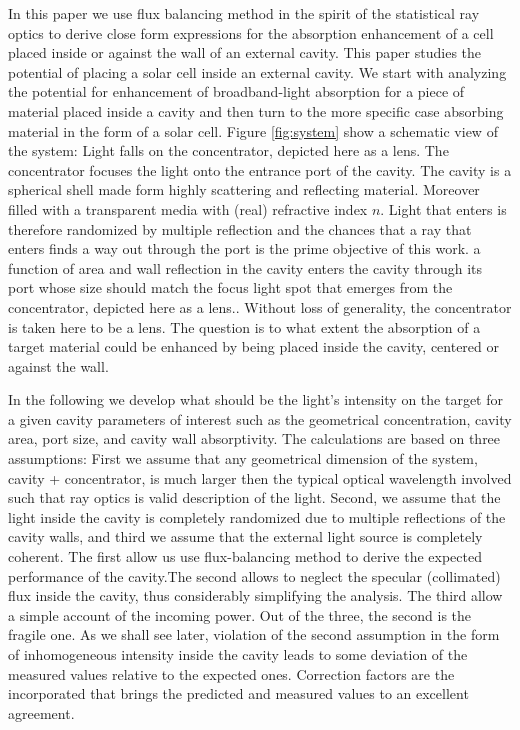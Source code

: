 \documentclass[a4paper]{article}
\begin{document}
In this paper we use flux balancing method in the spirit of the statistical ray optics to derive close form expressions for the absorption enhancement of a cell placed inside or against the wall of an external cavity.
\listoftodos
This paper studies the potential of placing a solar cell inside an external cavity. We start with analyzing the potential for enhancement of broadband-light absorption for a piece of material placed inside a cavity and then turn to the  more specific case absorbing material in the form of a solar cell. Figure \ref{fig:system} show a schematic view of the system: Light falls on the concentrator, depicted here as a lens. The concentrator focuses the light onto the entrance port of the cavity. The cavity is a spherical shell made form highly scattering and reflecting material. Moreover  filled with a transparent media with (real) refractive index $n$. Light that enters is therefore randomized by multiple reflection and the chances that a ray that enters finds a way out through the port is the prime objective of this work.  a function of area and wall reflection in the cavity enters the cavity through its port whose size should match the focus light spot that emerges from the concentrator, depicted here as a lens.. Without loss of generality, the concentrator is taken here to be a lens. The question is to what extent the absorption of a target material could be enhanced by being placed inside the cavity, centered or against the wall.

In the following we develop what should be the light’s intensity on the target for a given cavity parameters of interest such as the geometrical concentration, cavity area, port size, and cavity wall absorptivity. The calculations are based on three assumptions: First we assume that any geometrical dimension of the system, cavity + concentrator, is much larger then the typical optical wavelength involved such that ray optics is valid description of the light. Second, we assume that the light inside the cavity is completely randomized due to multiple reflections of the cavity walls, and third we assume that the external light source is completely coherent. The first allow us use flux-balancing method to derive the expected performance of the cavity.The second allows to neglect the specular (collimated) flux inside the cavity, thus considerably simplifying the analysis. The third allow a simple account of the incoming power. Out of the three, the second is the fragile one. As we shall see later, violation of the second assumption in the form of inhomogeneous intensity inside the cavity leads to some deviation of the measured values relative to the expected ones. Correction factors are the incorporated that brings the predicted and measured values to an excellent agreement.
\end{document}
